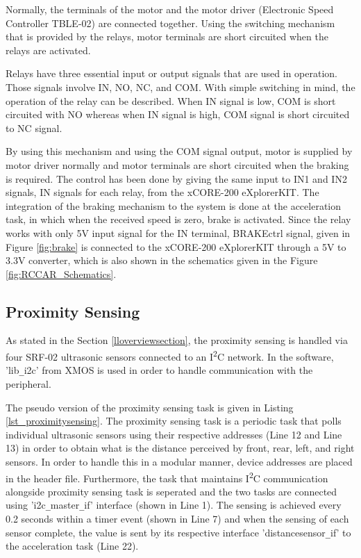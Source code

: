Normally, the terminals of the motor and the motor driver (Electronic Speed Controller TBLE-02) are connected together. Using the switching mechanism that is provided by the relays, motor terminals are short circuited when the relays are activated. 

Relays have three essential input or output signals that are used in operation. Those signals involve IN, NO, NC, and COM. With simple switching in mind, the operation of the relay can be described. When IN signal is low, COM is short circuited with NO whereas when IN signal is high, COM signal is short circuited to NC signal. 

By using this mechanism and using the COM signal output, motor is supplied by motor driver normally and motor terminals are short circuited when the braking is required. The control has been done by giving the same input to IN1 and IN2 signals, IN signals for each relay, from the xCORE-200 eXplorerKIT. The integration of the braking mechanism to the system is done at the acceleration task, in which when the received speed is zero, brake is activated. Since the relay works with only 5V input signal for the IN terminal, BRAKEctrl signal, given in Figure \ref{fig:brake} is connected to the xCORE-200 eXplorerKIT through a 5V to 3.3V converter, which is also shown in the schematics given in the Figure \ref{fig:RCCAR_Schematics}.

\subsection{Proximity Sensing}
As stated in the Section \ref{lloverviewsection}, the proximity sensing is handled via four SRF-02 ultrasonic sensors connected to an I\textsuperscript{2}C network. In the software, 'lib\texttt{\_}i2c' from XMOS is used in order to handle communication with the peripheral. 

The pseudo version of the proximity sensing task is given in Listing \ref{lst_proximitysensing}. The proximity sensing task is a periodic task that polls individual ultrasonic sensors using their respective addresses (Line 12 and Line 13) in order to obtain what is the distance perceived by front, rear, left, and right sensors. In order to handle this in a modular manner, device addresses are placed in the header file. Furthermore, the task that maintains I\textsuperscript{2}C communication alongside proximity sensing task is seperated and the two tasks are connected using 'i2c\texttt{\_}master\texttt{\_}if' interface (shown in Line 1). The sensing is achieved every 0.2 seconds within a timer event (shown in Line 7) and when the sensing of each sensor complete, the value is sent by its respective interface 'distancesensor\texttt{\_}if' to the acceleration task (Line 22). 

